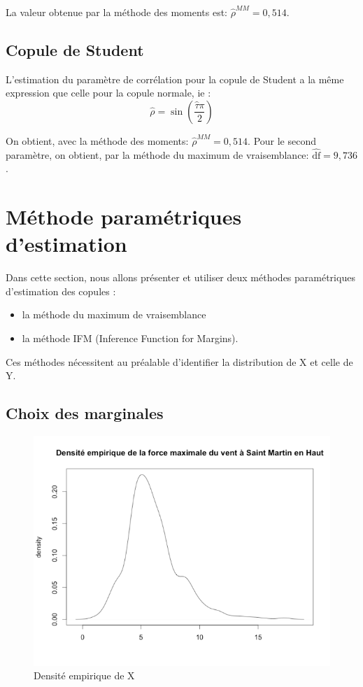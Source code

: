 La valeur obtenue par la méthode des moments est: $\widehat{\rho}^{MM} = 0,514$.

\subsection{Copule de Student}

L'estimation du paramètre de corrélation pour la copule de Student a la même expression que celle pour la copule normale, ie :
$$
\widehat{\rho} = \operatorname{sin}\left(\frac{\widehat{\tau} \pi}{2} \right)
$$

On obtient, avec la méthode des moments: $\widehat{\rho}^{MM} = 0,514$. Pour le second paramètre, on obtient, par la méthode du maximum de vraisemblance: $\widehat{\text{df}} = 9,736$.

\section{Méthode paramétriques d'estimation}

Dans cette section, nous allons présenter et utiliser deux méthodes paramétriques d'estimation
des copules :

\begin{itemize}
\item la méthode du maximum de vraisemblance
\item la méthode IFM (Inference Function for Margins).
\end{itemize}

Ces méthodes nécessitent au préalable d'identifier la distribution de X et celle de Y.

\subsection{Choix des marginales}

\noindent%
\begin{figure}[H]
    \begin{center}
      \includegraphics[width=12 cm, angle=0]{./pictures/densityx.png}
      \centering\caption{\label{2} Densité empirique de X}
    \end{center}
\end{figure}


